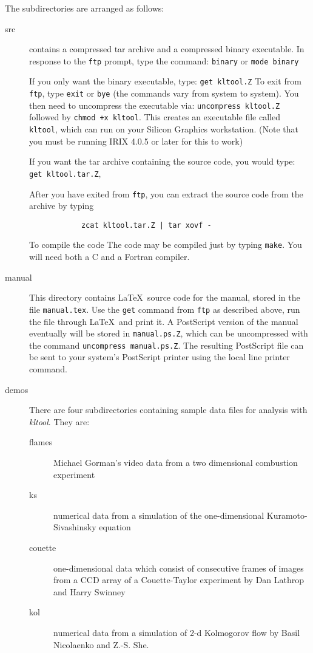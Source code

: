 The subdirectories are arranged as follows:
\begin{description}
	\item[src]  contains a compressed tar archive and a compressed
		  binary executable.  
		  In response to the {\tt ftp} prompt, type the command:
			{\tt binary}
		  or
			{\tt mode binary}

		  If you only want the 
		  binary executable, type:
			{\tt get kltool.Z}
		  To exit from {\tt ftp}, type {\tt exit} or {\tt bye}
		  (the commands vary from system to system).
		  You then need to uncompress the executable via:
			{\tt uncompress kltool.Z}
		  followed by
		  {\tt chmod +x kltool}.
		  This creates an executable file called {\tt kltool},
		  which can run on your Silicon Graphics workstation.
		  (Note that you must be running IRIX 4.0.5 or later
		  for this to work)
		  
		  If you want the tar archive containing the source
		  code, you would type:
			{\tt get kltool.tar.Z},


		  After you have exited from {\tt ftp}, you can 
		  extract the source code from the archive by typing
		  \begin{verbatim}
			zcat kltool.tar.Z | tar xovf -
		  \end{verbatim}
		  To compile the code
		  The code may be compiled just by typing {\tt make}.
		  You will need both a C and a Fortran compiler.
		  


	\item[manual] This directory contains \LaTeX\ source code
		for the manual, stored in the file {\tt manual.tex}.
		Use the {\tt get} command from {\tt ftp} as described
		above, run the file through \LaTeX\ and print it.
		A PostScript version of the manual eventually will be
		stored in {\tt manual.ps.Z}, which can be uncompressed
		with the command
			{\tt uncompress manual.ps.Z}.
		The resulting PostScript file can be sent to your
		system's PostScript printer using the local line
		printer command.

	\item[demos] There are four subdirectories containing sample data files
		for analysis with {\sl kltool}.  They are:
		\begin{description}
			\item[flames] Michael Gorman's video data from a 
				  two dimensional combustion experiment
			\item[ks] numerical data from a simulation of the
				  one-dimensional Kuramoto-Sivashinsky
				  equation
			\item[couette]	one-dimensional data which consist of
				  consecutive frames of images from a CCD
				  array of a Couette-Taylor experiment
				  by Dan Lathrop and Harry Swinney
			\item[kol]  numerical data from a simulation of
				  2-d Kolmogorov flow by Basil Nicolaenko
				  and Z.-S. She.
		\end{description}
	\end{description}
